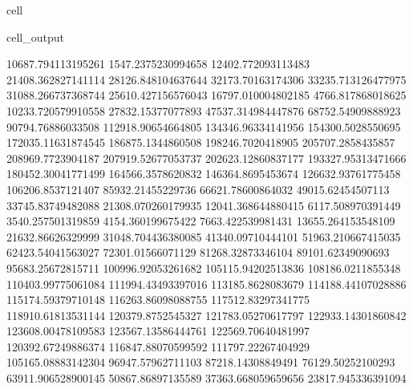 \documentclass[letterpaper,10pt,english]{jupyterBook}
\begin{document}
\begin{sphinxuseclass}{cell}
\begin{sphinxVerbatimOutput}
\begin{sphinxuseclass}{cell_output}
\begin{sphinxVerbatim}[commandchars=\\\{\}]
10687.794113195261  \PYGZhy{}1547.2375230994658  \PYGZhy{}12402.772093113483  \PYGZhy{}21408.362827141114  \PYGZhy{}28126.848104637644  \PYGZhy{}32173.70163174306  \PYGZhy{}33235.713126477975  \PYGZhy{}31088.266737368744  \PYGZhy{}25610.427156576043  \PYGZhy{}16797.010004802185  \PYGZhy{}4766.817868018625  10233.720579910558  27832.15377077893  47537.314984447876  68752.54909888923  90794.76886033508  112918.90654664805  134346.96334141956  154300.5028550695  172035.11631874545  186875.1344860508  198246.7020418905  205707.2858435857  208969.7723904187  207919.52677053737  202623.12860837177  193327.95313471666  180452.30041771499  164566.3578620832  146364.8695453674  126632.93761775458  106206.8537121407  85932.21455229736  66621.78600864032  49015.62454507113  33745.83749482088  21308.070260179935  12041.368644880415  6117.508970391449  3540.257501319859  4154.360199675422  7663.422539981431  13655.264153548109  21632.86626329999  31048.704436380085  41340.09710444101  51963.210667415035  62423.54041563027  72301.01566071129  81268.32873346104  89101.62349090693  95683.25672815711  100996.92053261682  105115.94202513836  108186.0211855348  110403.99775061084  111994.43493397016  113185.8628083679  114188.44107028886  115174.59379710148  116263.86098088755  117512.83297341775  118910.61813531144  120379.8752545327  121783.05270617797  122933.14301860842  123608.00478109583  123567.13586444761  122569.70640481997  120392.67249886374  116847.88070599592  111797.22267404929  105165.08883142304  96947.57962711103  87218.14308849491  76129.50252100293  63911.906528900145  50867.86897135589  37363.668059659656  23817.945336391094  

\end{sphinxVerbatim}
\end{sphinxuseclass}
\end{sphinxVerbatimOutput}
\end{sphinxuseclass}
\end{document}
